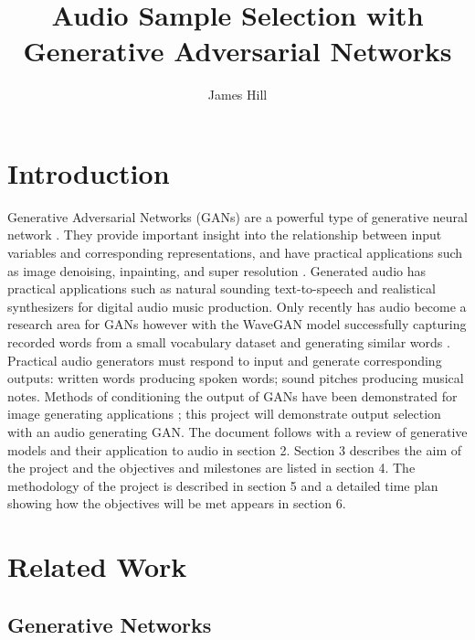 \documentclass[a4paper, dvipsnames, titlepage]{article}
\title{Audio Sample Selection with Generative Adversarial Networks}
\author{James Hill}
\date{}
\begin{document}
\maketitle
\tableofcontents

\newpage

\section{Introduction}

Generative Adversarial Networks (GANs) are a powerful type of generative neural network \citep{2014arXiv1406.2661G}.
They provide important insight into the relationship between input variables and corresponding representations, and have practical applications such as image denoising, inpainting, and super resolution \citep{openai_blog_2017}.
\newline
\newline
Generated audio has practical applications such as natural sounding text-to-speech and realistical synthesizers for digital audio music production.
Only recently has audio become a research area for GANs however with the WaveGAN model successfully capturing recorded words from a small vocabulary dataset and generating similar words \citep{2018arXiv180204208D}.
\newline
\newline
Practical audio generators must respond to input and generate corresponding outputs: written words producing spoken words; sound pitches producing musical notes.
Methods of conditioning the output of GANs have been demonstrated for image generating applications \citep{2014arXiv1411.1784M}; this project will demonstrate output selection with an audio generating GAN.
\newline
\newline
The document follows with a review of generative models and their application to audio in section 2.
Section 3 describes the aim of the project and the objectives and milestones are listed in section 4.
The methodology of the project is described in section 5 and a detailed time plan showing how the objectives will be met appears in section 6.

\newpage

\section{Related Work}

\subsection{Generative Networks}
\end{document}

